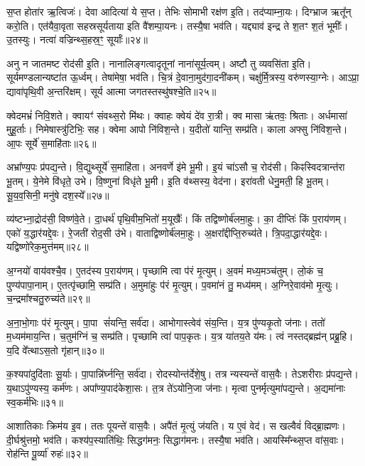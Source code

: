 स॒प्त होता॑र ऋ॒त्विजः॑। देवा आदित्या॑ ये स॒प्त। 
तेभिः सोमाभी रक्ष॑ण इ॒ति। तद॑प्याम्ना॒यः। 
दिग्भ्राज ऋतू᳚न्‌ करो॒ति। एत॑यैवा॒वृता सहस्रसूर्यताया इति वै॑शम्पा॒यनः। 
तस्यै॒षा भव॑ति। यद्द्याव॑ इन्द्र ते श॒तꣳ श॒तं भूमीः᳚। 
उ॒तस्युः। नत्वा॑ वज्रिन्थ्स॒हस्र॒ꣳ॒ सूर्याः᳚॥२४॥

अनु न जातमष्ट रोद॑सी इ॒ति। नानालिङ्गत्वादृतूनां नाना॑सूर्य॒त्वम्। 
अष्टौ तु व्यवसि॑ता इ॒ति। सूर्यमण्डलान्यष्टा॑त ऊ॒र्ध्वम्। 
तेषा॑मेषा॒ भव॑ति। चि॒त्रं दे॒वाना॒मुद॑गा॒दनी॑कम्। 
चक्षु॑र्मि॒त्रस्य॒ वरु॑णस्या॒ग्नेः। आऽप्रा॒ द्यावा॑पृथि॒वी अ॒न्तरि॑क्षम्। 
सूर्य आत्मा जगतस्तस्थु॑षश्चे॒ति॥२५॥\anuvakamend


क्वेदमभ्रं॑ निवि॒शते। क्वायꣳ॑ संवथ्स॒रो मि॑थः। 
क्वाहः क्वेयं दे॑व रा॒त्री। क्व मासा ऋ॑तवः॒ श्रिताः। 
अर्धमासा॑ मुहू॒र्ताः। निमेषास्त्रु॑टिभिः॒ सह। 
क्वेमा आपो नि॑विश॒न्ते। य॒दीतो॑ यान्ति॒ सम्प्र॑ति। 
काला अफ्सु नि॑विश॒न्ते। आ॒पः सूर्ये॑ स॒माहि॑ताः॥२६॥

अभ्रा᳚ण्य॒पः प्र॑पद्य॒न्ते। वि॒द्युथ्सूर्ये॑ स॒माहि॑ता। 
अनवर्णे इ॑मे भू॒मी। इ॒यं चा॑ऽसौ च॒ रोद॑सी। 
किꣴस्विदत्रान्त॑रा भू॒तम्। ये॒नेमे वि॑धृते॒ उभे। 
वि॒ष्णुना॑ विधृ॑ते भू॒मी। इ॒ति व॑थ्सस्य॒ वेद॑ना। 
इरा॑वती धेनु॒मती॒ हि भू॒तम्। सू॒य॒व॒सिनी॒ मनु॑षे दश॒स्ये᳚॥२७॥

व्य॑ष्टभ्ना॒द्रोद॑सी॒ विष्ण॑वे॒ते। दा॒धर्थ॑ पृथि॒वीम॒भितो॑ म॒यूखैः᳚। 
किं तद्विष्णोर्ब॑ल\-मा॒हुः। का॒ दीप्तिः॑ किं प॒राय॑णम्। 
एको॑ य॒द्धार॑यद्दे॒वः। रे॒जती॑ रोद॒सी उ॑भे। 
वाताद्विष्णोर्ब॑लमा॒हुः। अ॒क्षरा᳚द्दीप्ति॒रुच्य॑ते। 
त्रि॒पदा॒द्धार॑यद्दे॒वः। यद्विष्णो॑रेक॒\-मुत्त॑मम्॥२८॥

अ॒ग्नयो॑ वाय॑वश्चै॒व। ए॒तद॑स्य प॒राय॑णम्। 
पृच्छामि त्वा प॑रं मृ॒त्युम्। अ॒वमं॑ मध्य॒मञ्च॑तुम्। 
लो॒कं च॒ पुण्य॑पापा॒नाम्। ए॒तत्पृ॑च्छामि॒ सम्प्र॑ति। 
अ॒मुमा॑हुः प॑रं मृ॒त्युम्। प॒वमा॑नं तु॒ मध्य॑मम्। 
अ॒ग्निरे॒वाव॑मो मृ॒त्युः। च॒न्द्रमा᳚श्चतु॒रुच्य॑ते॥२९॥

अ॒ना॒भो॒गाः प॑रं मृ॒त्युम्। पा॒पा सं॑यन्ति॒ सर्व॑दा। 
आभोगास्त्वेव॑ संय॒न्ति। य॒त्र पु॑ण्यकृ॒तो ज॑नाः। 
ततो॑ म॒ध्यम॑माय॒न्ति। च॒तुम॑ग्निं च॒ सम्प्र॑ति। 
पृच्छामि त्वा॑ पाप॒कृतः। य॒त्र या॑तय॒ते य॑मः। 
त्वं नस्तद्ब्रह्म॑न्‌ प्रब्रू॒हि। य॒दि वे᳚त्थाऽस॒तो गृ॑हान्॥३०॥

क॒श्यपा॑दुदि॑ताः सू॒र्याः। पा॒पान्नि॑र्घ्नन्ति॒ सर्व॑दा। 
रोदस्योन्त॑र्दे\-शे॒षु। तत्र न्यस्यन्ते॑ वास॒वैः। 
तेऽशरीराः प्र॑पद्य॒न्ते। य॒था\-ऽपु॑ण्यस्य॒ कर्म॑णः। 
अपा᳚ण्य॒पाद॑केशा॒सः। त॒त्र ते॑ऽयोनि॒जा ज॑नाः। 
मृत्वा पुनर्मृत्युमा॑पद्य॒न्ते। अ॒द्यमा॑नाः स्व॒कर्म॑भिः॥३१॥

आशातिकाः क्रिम॑य इ॒व। ततः पूयन्ते॑ वास॒वैः। अपै॑तं मृ॒त्युं ज॑यति। 
य ए॒वं वेद॑। स खल्वैवं॑ विद्ब्रा॒ह्मणः। दी॒र्घश्रु॑त्तमो॒ भव॑ति। 
कश्य॑प॒स्याति॑थिः॒ सिद्धग॑मनः॒ सिद्धाग॑मनः। तस्यै॒षा भव॑ति। 
आयस्मि᳚न्थ्स॒प्त वा॑स॒वाः। रोह॑न्ति पू॒र्व्या॑ रुहः॑॥३२॥

